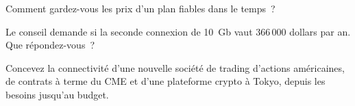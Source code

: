 \begin{interviewq}\label{iq:nw:build-a-connectivity-plan:4}
Comment gardez-vous les prix d'un plan fiables dans le temps~?
\end{interviewq}

\begin{interviewq}\label{iq:nw:build-a-connectivity-plan:5}
Le conseil demande si la seconde connexion de 10~Gb vaut 366\,000 dollars par an. Que répondez-vous~?
\end{interviewq}

\begin{interviewq}\label{iq:nw:build-a-connectivity-plan:6}
Concevez la connectivité d'une nouvelle société de trading d'actions américaines, de contrats à terme du CME et d'une plateforme crypto à Tokyo, depuis les besoins jusqu'au budget.
\end{interviewq}
